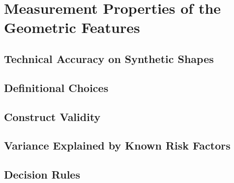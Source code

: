 \section{Measurement Properties of the Geometric Features}
\label{sec:method-validity}


\subsection{Technical Accuracy on Synthetic Shapes}
\label{sec:method-validity-accuracy}

\subsection{Definitional Choices}
\label{sec:method-validity-definitions}
\label{sec:method-validity-sensitivity}

\subsection{Construct Validity}
\label{sec:method-validity-groups}
\label{sec:method-validity-evidence}

\subsection{Variance Explained by Known Risk Factors}
\label{sec:method-validity-split}

\subsection{Decision Rules}
\label{sec:method-validity-reading}
